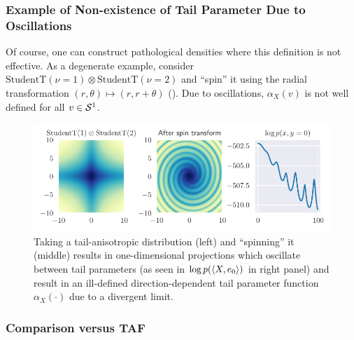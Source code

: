 \documentclass[../../thesis.tex]{subfiles}
\begin{document}


\subsubsection{Example of Non-existence of Tail Parameter Due to Oscillations}
\label{eg:spiral}
Of course, one can construct pathological densities where this definition is not effective.
As a degenerate example, consider
$\text{StudentT}(\nu=1) \otimes \text{StudentT}(\nu=2)$ and ``spin'' it
using the radial transformation $(r,\theta) \mapsto (r,r+\theta)$ (). Due to
oscillations, $\alpha_X(v)$ is not well defined for all $v \in {\mathcal{S}}^{1}$.


\begin{figure}[htbp]
  \centering
  \includegraphics[scale=0.8]{ftvi/Figures/spiral.pdf}
  \caption{Taking a tail-anisotropic distribution (left) and ``spinning'' it (middle) results in
    one-dimensional projections which oscillate between tail parameters (as seen in
    $\log p(\braket{X,e_0})$ in right panel) and result in an ill-defined
    direction-dependent tail parameter function $\alpha_X(\cdot)$ due to a
    divergent limit.
  }
  \label{fig:spiral}
\end{figure}





\subsubsection{Comparison versus TAF}
\end{document}
